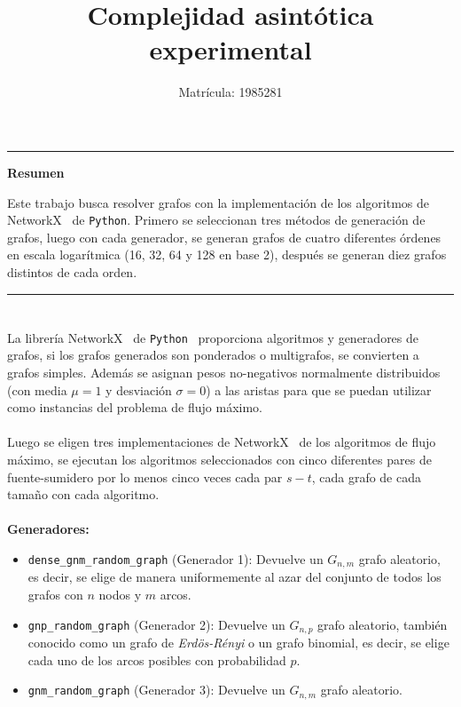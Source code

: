 \documentclass[a4paper, 11pt]{article}
\begin{document}
\title{Complejidad asintótica experimental}
\author{Matr\'icula: 1985281}
\date{ }
\maketitle

\vspace{-1 cm}
\begin{center}\rule{\textwidth}{0.1mm} \end{center}
\vspace{-1.3 cm}
\begin {center}
\item \Large{\textbf{ Resumen}}
\end {center}

Este trabajo busca resolver grafos con la implementación de los algoritmos  de \color{blue}NetworkX\color{black}  \  de \color{blue} \texttt{Python}\color{black}. Primero se seleccionan tres métodos de generación de grafos, luego con cada generador, se generan grafos de cuatro diferentes órdenes en escala logarítmica (16, 32, 64 y 128 en base 2), después se generan diez grafos distintos de cada orden.
\vspace{-0.5cm}
\begin{center}\rule{\textwidth}{0.1mm} \end{center}




\section*{}
La librería \color{blue}NetworkX\color{black} \ de \color{blue}\texttt{Python} \color{black} \ proporciona algoritmos y generadores de grafos,  si los grafos generados son ponderados o multigrafos, se convierten a grafos simples. Además se asignan pesos no-negativos normalmente distribuidos (con media $\mu=1$ y desviación $\sigma = 0$) a las aristas para que se puedan utilizar como instancias del problema de flujo máximo. 
\\
\\
Luego se eligen tres implementaciones de \color{blue}NetworkX\color{black}  \  de los algoritmos de flujo máximo, se ejecutan los algoritmos seleccionados con cinco diferentes pares de fuente-sumidero por lo menos cinco veces cada par $s-t$, cada grafo de cada tamaño con cada algoritmo.
\\
\\
\textbf{Generadores:}
\begin{itemize}
\item \texttt{dense\_gnm\_random\_graph} (Generador 1): Devuelve un $G_ {n, m}$ grafo aleatorio, es decir, se elige de manera uniformemente al azar del conjunto de todos los grafos  con $n$ nodos y $m$ arcos.
\item \texttt{gnp\_random\_graph} (Generador 2): Devuelve un $G_ {n, p}$ grafo aleatorio, también conocido como un grafo de \textit{Erdös-Rényi} o un grafo binomial, es decir, se elige cada uno de los arcos posibles con probabilidad $p$.
\item \texttt{gnm\_random\_graph} (Generador 3): Devuelve un $G_ {n, m}$ grafo aleatorio.
\end{itemize}
\end{document}
